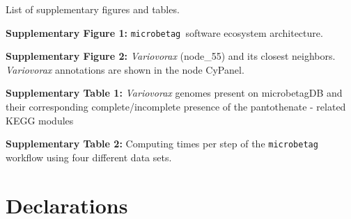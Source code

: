 \documentclass[sn-mathphys,Numbered]{sn-jnl}  %
\theoremstyle{thmstyleone}%
\theoremstyle{thmstyletwo}%
\theoremstyle{thmstylethree}%
\newcommand{\microbetag}{\texttt{microbetag }}
\begin{document}
\backmatter



\label{supplementary-files}
    
    List of supplementary figures and tables.

    \textbf{Supplementary Figure 1:} \microbetag software ecosystem architecture.

    \textbf{Supplementary Figure 2:} \textit{Variovorax} (node\_55) and its closest neighbors. \textit{Variovorax} annotations are shown in the node CyPanel.

    \textbf{Supplementary Table 1:} \textit{Variovorax} genomes present on microbetagDB and their corresponding complete/incomplete presence of the pantothenate - 
    related KEGG modules

    \textbf{Supplementary Table 2:} Computing times per step of the \microbetag workflow using four different data sets. 



\section*{Declarations}
\end{document}
